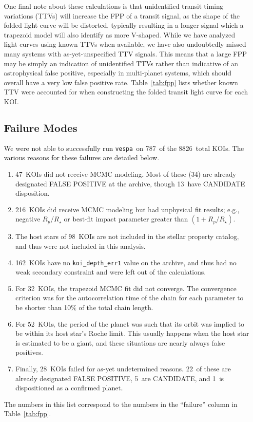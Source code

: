\documentclass{emulateapj}
\newcommand{\Tab}[1]{Table~\ref{tab:#1}}
\newcommand{\tab}[1]{\Tab{#1}}
\newcommand{\sectlabel}[1]{\label{sect:#1}}
\newcommand{\ntotal}{8826}
\newcommand{\nfail}{787}
\newcommand{\nbadphot}{47} %
\newcommand{\nbadphotFP}{34}
\newcommand{\nbadphotCAND}{13}
\newcommand{\nbadrowemcmc}{216}
\newcommand{\nbadstellar}{98} %
\newcommand{\nbadsec}{162} %
\newcommand{\nbadtrapfit}{32}
\newcommand{\nbadroche}{52}
\newcommand{\nbadother}{28}
\newcommand{\nbadotherFP}{22}
\newcommand{\nbadotherCAND}{5}
\newcommand{\nbadotherCONF}{1}
\newcommand{\vespa}{\texttt{vespa}}
\begin{document}
One final note about these calculations is that unidentified
transit timing variations (TTVs) will increase the FPP of a transit
signal, as the shape of the folded light curve will be distorted,
typically resulting in a longer signal which a trapezoid model will
also identify as more V-shaped.  While we have analyzed light curves
using known TTVs when available, we have also undoubtedly missed many
systems with as-yet-unspecified TTV signals.  This means that a large
FPP may be simply an indication of unidentified TTVs rather than
indicative of an astrophysical false positive, especially in
multi-planet systems, which should overall have a very low false
positive rate.  \Tab{fpp} lists whether known TTV were accounted for
when constructing the folded transit light curve for each KOI.


\subsection{Failure Modes}
\sectlabel{failures}


We were not able to successfully run \vespa\ on \nfail\ of the
\ntotal\ total KOIs. The various reasons for these failures are
detailed below.  
\begin{enumerate}
\item \nbadphot\ KOIs did not receive MCMC modeling.  Most of these
  (\nbadphotFP) are already designated FALSE POSITIVE at the archive,
  though \nbadphotCAND\ have CANDIDATE disposition.
\item \nbadrowemcmc\ KOIs did receive MCMC modeling but had unphysical fit
  results; e.g., negative $R_p/R_\star$ or best-fit impact parameter
  greater than $(1 + R_p/R_\star)$.
\item The host stars of \nbadstellar\ KOIs are not included in the
   stellar property catalog, and thus were not
  included in this analysis.
\item \nbadsec\ KOIs have no \verb|koi_depth_err1| value on the archive,
  and thus had no weak secondary constraint and were left out of the
  calculations.
\item For \nbadtrapfit\ KOIs, the trapezoid MCMC fit did not converge.  The
  convergence criterion was for the autocorrelation time of the chain
  for each parameter to be shorter than 10\% of the total chain
  length.
\item For \nbadroche\ KOIs, the period of the planet was such that its
  orbit was implied to be within its host star's Roche limit.  This
  usually happens when the host star is estimated to be a giant, and
  these situations are nearly always false positives. 
\item Finally, \nbadother\ KOIs failed for as-yet undetermined
  reasons.  \nbadotherFP\ of these are already designated FALSE
  POSITIVE, \nbadotherCAND\ are CANDIDATE, and \nbadotherCONF\ is
  dispositioned as a confirmed planet.
\end{enumerate}
The numbers in this list correspond to the numbers in
the ``failure'' column in \tab{fpp}.
\end{document}
